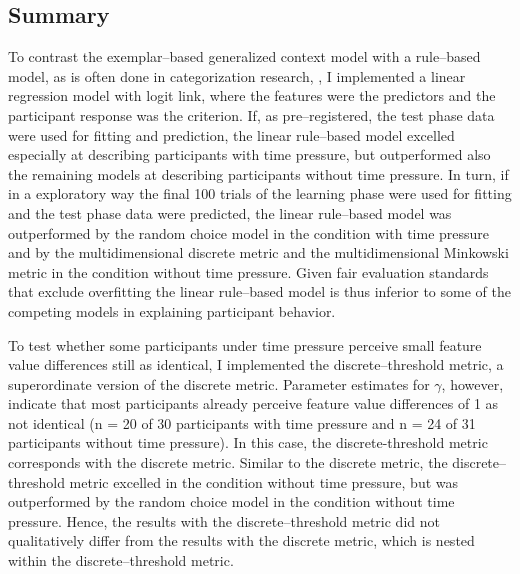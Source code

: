 \documentclass[a4paper,man,natbib]{apa6}
\begin{document}
\subsection{Summary}
To contrast the exemplar--based generalized context model with a rule--based model, as is often done in categorization research, \citep{restle1962selection, tom1968attention, rouder2006comparing}, I implemented a linear regression model with logit link, where the features were the predictors and the participant response was the criterion. 
If, as pre--registered, the test phase data were used for fitting and prediction, the linear rule--based model excelled especially at describing participants with time pressure, but outperformed also the remaining models at describing participants without time pressure. In turn, if in a exploratory way the final 100 trials of the learning phase were used for fitting and the test phase data were predicted, the linear rule--based model was outperformed by the random choice model in the condition with time pressure and by the multidimensional discrete metric and the multidimensional Minkowski metric in the condition without time pressure. Given fair evaluation standards that exclude overfitting the linear rule--based model is thus inferior to some of the competing models in explaining participant behavior.

To test whether some participants under time pressure perceive small feature value differences still as identical, I implemented the discrete--threshold metric, a superordinate version of the discrete metric. Parameter estimates for $\gamma$, however, indicate that most participants already perceive feature value differences of 1 as not identical (n = 20 of 30 participants with time pressure and n = 24 of 31 participants without time pressure). In this case, the discrete-threshold metric corresponds with the discrete metric. Similar to the discrete metric, the discrete--threshold metric excelled in the condition without time pressure, but was outperformed by the random choice model in the condition without time pressure. 
Hence, the results with the discrete--threshold metric did not qualitatively differ from the results with the discrete metric, which is nested within the discrete--threshold metric.
\end{document}
